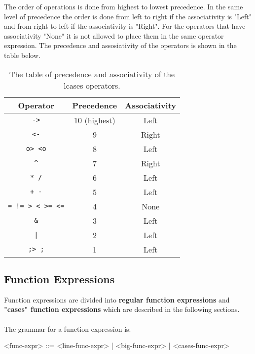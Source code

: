\documentclass{article}
\begin{document}
\newpage\noindent
The order of operations is done from highest to lowest precedence. In the same
level of precedence the order is done from left to right if the associativity
is "Left" and from right to left if the associativity is "Right". For the
operators that have associativity "None" it is not allowed to place them in the
same operator expression. The precedence and assosiativity of the operators
is shown in the table below.

\begin{table}[h]

\caption{ The table of precedence and associativity of the lcases operators.  }

\begin{center}
\begin{tabular}{ |c|c|c| } 
\hline
Operator & Precedence & Associativity \\ 
\hline
\hline
\texttt{->} & 10 (highest) & Left \\
\hline
\texttt{<-} & 9 & Right \\
\hline
\texttt{o> <o} & 8 & Left \\
\hline
\texttt{\^} & 7 & Right \\
\hline
\texttt{* /} & 6 & Left \\
\hline
\texttt{+ -} & 5 & Left \\ 
\hline
\texttt{= != > < >= <=} & 4 & None \\
\hline
\texttt{\&} & 3 & Left \\
\hline
\texttt{|} & 2 & Left \\
\hline
\texttt{;> ;} & 1 & Left \\
\hline
\end{tabular}
\end{center}

\label{table:precassoc}

\end{table}

\newpage
\subsection{Function Expressions}
\label{subsec:funcexprs}

Function expressions are divided into \textbf{regular function expressions} and 
\textbf{"cases" function expressions} which are described in the following sections.
\\\\
The grammar for a function expression is:
\begin{grammar}
<func-expr> ::= <line-func-expr> | <big-func-expr> | <cases-func-expr>
\end{grammar}
\end{document}
